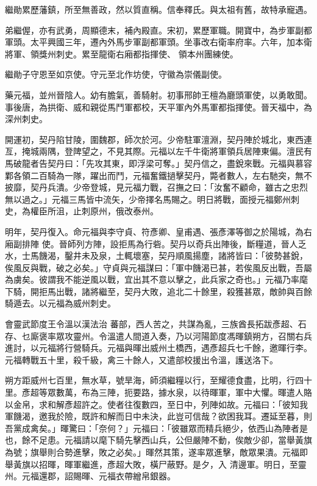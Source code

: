 \begin{pinyinscope}
 繼勛累歷藩鎮，所至無善政，然以質直稱。信奉釋氏。與太祖有舊，故特承寵遇。



 弟繼偓，亦有武勇，周顯德末，補內殿直。宋初，累歷軍職。開寶中，為步軍副都軍頭。太平興國三年，遷內外馬步軍副都軍頭。坐事改右衛率府率。六年，加本衛將軍、領獎州刺史。累至龍衛右廂都指揮使、
 領本州團練使。



 繼勛子守恩至如京使。守元至北作坊使，守徽為崇儀副使。



 藥元福，並州晉陰人。幼有膽氣，善騎射。初事邢帥王檀為廳頭軍使，以勇敢聞。事後唐，為拱衛、威和親從馬鬥軍都校，天平軍內外馬軍都指揮使。晉天福中，為深州刺史。



 開運初，契丹陷甘陵，圍魏郡，師次於河。少帝駐軍澶淵，契丹陣於城北，東西連亙，掩城兩隅，登陴望之，不見其際。元福以左千牛衛將軍領兵居陣東偏。澶民有
 馬破龍者告契丹曰：「先攻其東，即浮梁可奪。」契丹信之，盡銳來戰。元福與慕容鄴各領二百騎為一隊，躍出而鬥，元福奮鐵撾擊契丹，斃者數人，左右馳突，無不披靡，契丹兵潰。少帝登城，見元福力戰，召撫之曰：「汝奮不顧命，雖古之忠烈無以過之。」元福三馬皆中流矢，少帝擇名馬賜之。明日將戰，面授元福鄭州刺史，為權臣所沮，止刺原州，俄改泰州。



 明年，契丹復入。命元福與李守貞、符彥卿、皇甫遇、張彥澤等御之於陽城，為右廂副排陣
 使。晉師列方陣，設拒馬為行砦。契丹以奇兵出陣後，斷糧道，晉人乏水，士馬饑渴，鑿井未及泉，土輒壞塞，契丹順風揚塵，諸將皆曰：「彼勢甚銳，俟風反與戰，破之必矣。」守貞與元福謀曰：「軍中饑渴已甚，若俟風反出戰，吾屬為虜矣。彼謂我不能逆風以戰，宜出其不意以擊之，此兵家之奇也。」元福乃率麾下騎，開拒馬出戰，諸將繼至，契丹大敗，追北二十餘里，殺獲甚眾，敵帥與百餘騎遁去。以元福為威州刺史。



 會靈武節度王令溫以漢法治
 蕃部，西人苦之，共謀為亂，三族酋長拓跋彥超、石存、乜廝褒率眾攻靈州。令溫遣人間道入奏，乃以河陽節度馮暉鎮朔方，召關右兵進討，以元福將行營騎兵。元福與暉出威州土橋西，遇彥超兵七千餘，邀暉行李。元福轉戰五十里，殺千級，禽三十餘人，又遣部校援出令溫，護送洛下。



 朔方距威州七百里，無水草，號旱海，師須繼糧以行，至耀德食盡，比明，行四十里。彥超等眾數萬，布為三陣，扼要路，據水泉，以待暉軍，軍中大懼。暉遣人賂
 以金帛，求和解彥超許之。使者往復數四，至日中，列陣如故。元福曰：「彼知我軍饑渴，邀我於險，既許和解而日中未決，此豈可信哉？欲困我耳。遷延至暮，則吾黨成禽矣。」暉驚曰：「奈何？」元福曰：「彼雖眾而精兵絕少，依西山為陣者是也，餘不足患。元福請以麾下騎先擊西山兵，公但嚴陣不動，俟敵少卻，當舉黃旗為號；旗舉則合勢進擊，敗之必矣。」暉然其策，遂率眾進擊，敵眾果潰。元福即舉黃旗以招暉，暉軍繼進，彥超大敗，橫尸蔽野。是夕，入
 清邊軍。明日，至靈州。元福還郡，詔賜暉、元福衣帶繒帛銀器。




\end{pinyinscope}
